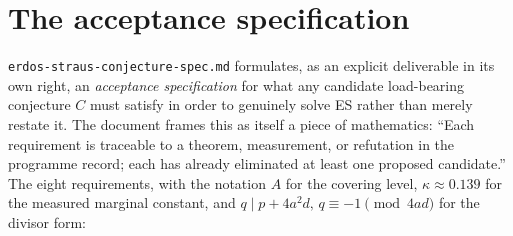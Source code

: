 \documentclass[11pt]{article}
\theoremstyle{plain}
\theoremstyle{definition}
\theoremstyle{remark}
\renewcommand{\_}{\textunderscore\allowbreak}
\begin{document}
\section{The acceptance specification}
\label{sec:spec}

\texttt{erdos-\allowbreak straus-\allowbreak conjecture-\allowbreak spec.md} formulates, as an explicit deliverable in its own right,
an \emph{acceptance specification} for what any candidate load-bearing conjecture $C$ must
satisfy in order to genuinely solve ES rather than merely restate it. The document frames this
as itself a piece of mathematics: ``Each requirement is traceable to a theorem, measurement, or
refutation in the programme record; each has already eliminated at least one proposed
candidate.'' The eight requirements, with the notation $A$ for the covering level, $\kappa\approx
0.139$ for the measured marginal constant, and $q\mid p+4a^2d,\,q\equiv-1\pmod{4ad}$ for the
divisor form:
\end{document}
